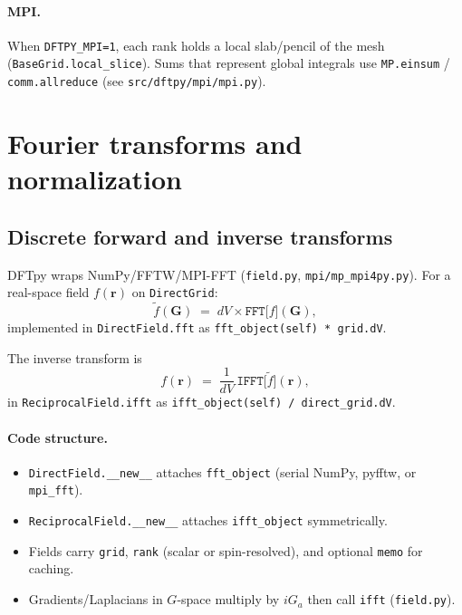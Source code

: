 \documentclass[11pt,a4paper]{article}
\begin{document}
\paragraph{MPI.}
When \texttt{DFTPY\_MPI=1}, each rank holds a local slab/pencil of the mesh
(\texttt{BaseGrid.local\_slice}). Sums that represent global integrals use
\texttt{MP.einsum} / \texttt{comm.allreduce} (see \texttt{src/dftpy/mpi/mpi.py}).

\section{Fourier transforms and normalization}
\label{sec:fft}

\subsection{Discrete forward and inverse transforms}

DFTpy wraps NumPy/FFTW/MPI-FFT (\texttt{field.py}, \texttt{mpi/mp\_mpi4py.py}).
For a real-space field $f(\mathbf r)$ on \texttt{DirectGrid}:
\begin{equation}
  \tilde f(\mathbf G) \;=\; dV \times \texttt{FFT}\bigl[f\bigr](\mathbf G),
\end{equation}
implemented in \texttt{DirectField.fft} as \texttt{fft\_object(self) * grid.dV}.

The inverse transform is
\begin{equation}
  f(\mathbf r) \;=\; \frac{1}{dV}\,\texttt{IFFT}\bigl[\tilde f\bigr](\mathbf r),
\end{equation}
in \texttt{ReciprocalField.ifft} as \texttt{ifft\_object(self) / direct\_grid.dV}.

\paragraph{Code structure.}
\begin{itemize}
  \item \texttt{DirectField.\_\_new\_\_} attaches \texttt{fft\_object} (serial NumPy, pyfftw, or \texttt{mpi\_fft}).
  \item \texttt{ReciprocalField.\_\_new\_\_} attaches \texttt{ifft\_object} symmetrically.
  \item Fields carry \texttt{grid}, \texttt{rank} (scalar or spin-resolved), and optional \texttt{memo} for caching.
  \item Gradients/Laplacians in $G$-space multiply by $iG_a$ then call \texttt{ifft} (\texttt{field.py}).
\end{itemize}
\end{document}
